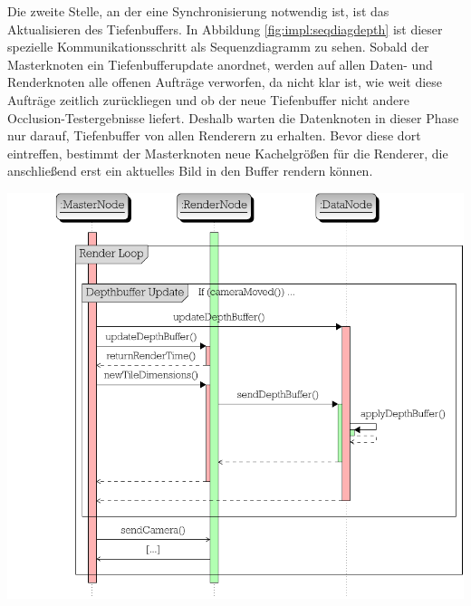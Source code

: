 Die zweite Stelle, an der eine Synchronisierung notwendig ist, ist das Aktualisieren des Tiefenbuffers. In Abbildung \ref{fig:impl:seqdiagdepth} ist dieser spezielle Kommunikationsschritt als Sequenzdiagramm zu sehen. Sobald der Masterknoten ein Tiefenbufferupdate anordnet, werden auf allen Daten- und Renderknoten alle offenen Aufträge verworfen, da nicht klar ist, wie weit diese Aufträge zeitlich zurückliegen und ob der neue Tiefenbuffer nicht andere Occlusion-Testergebnisse liefert. Deshalb warten die Datenknoten in dieser Phase nur darauf, Tiefenbuffer von allen Renderern zu erhalten. Bevor diese dort eintreffen, bestimmt der Masterknoten neue Kachelgrößen für die Renderer, die anschließend erst ein aktuelles Bild in den Buffer rendern können.\\

\begin{Bild}
\includegraphics[scale=0.85]{images/seq_diag_depth.pdf}
\end{Bild}

%
%
